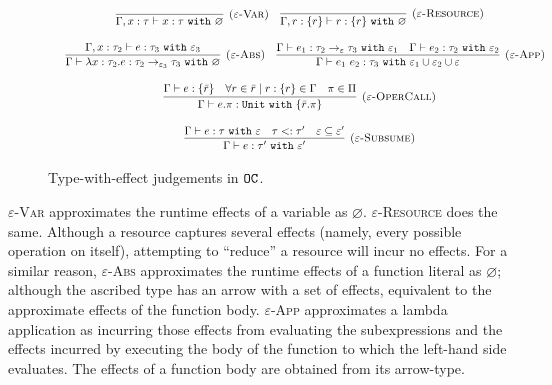 \begin{figure}[h]

\noindent
{}

\[
\begin{array}{c}

\infer[\textsc{($\varepsilon$-Var)}]
	{ \Gamma, x:\tau \vdash x: \tau~\kw{with} \varnothing }
	{}
	
	~~~
	
\infer[\textsc{($\varepsilon$-Resource)}]
 	{ \Gamma, r: \{ r \} \vdash r : \{ r \}~\kw{with} \varnothing }
 	{} \\[3ex]
 	
 	~~~
	\infer[\textsc{($\varepsilon$-Abs)}]
	{ \Gamma \vdash \lambda x:\tau_2 . e : \tau_2 \rightarrow_{\varepsilon_3} \tau_3~\kw{with} \varnothing }
	{ \Gamma, x: \tau_2 \vdash e: \tau_3~\kw{with} \varepsilon_3 }
	
	~~~
	
\infer[\textsc{($\varepsilon$-App)}]
	{ \Gamma \vdash e_1~e_2 : \tau_3~\kw{with} \varepsilon_1 \cup \varepsilon_2 \cup \varepsilon  }
	{ \Gamma \vdash e_1: \tau_2 \rightarrow_{\varepsilon} \tau_3~\kw{with} \varepsilon_1 & \Gamma \vdash e_2: \tau_2~\kw{with} \varepsilon_2 } \\[3ex]
	
\infer[\textsc{($\varepsilon$-OperCall)}]
	{ \Gamma \vdash e.\pi: \kw{Unit} \kw{with} \{ \bar r.\pi \} }
	{ \Gamma \vdash e: \{ \bar r \} & \forall r \in \bar r \mid r: \{ r \} \in \Gamma & \pi \in \Pi } \\[3ex]

\infer[\textsc{($\varepsilon$-Subsume)}]
	{ \Gamma \vdash e: \tau' ~\kw{with} \varepsilon'}
	{ \Gamma \vdash e: \tau ~\kw{with} \varepsilon & \tau <: \tau' & \varepsilon \subseteq \varepsilon'}
\end{array}
\]


\vspace{-7pt}
\caption{Type-with-effect judgements in $\mathtt{OC}$.}
\label{fig:opercalc_static_rules}
\end{figure}

\textsc{$\varepsilon$-Var} approximates the runtime effects of a variable as $\varnothing$. \textsc{$\varepsilon$-Resource} does the same. Although a resource captures several effects (namely, every possible operation on itself), attempting to ``reduce'' a resource will incur no effects. For a similar reason, \textsc{$\varepsilon$-Abs} approximates the runtime effects of a function literal as $\varnothing$; although the ascribed type has an arrow with a set of effects, equivalent to the approximate effects of the function body. \textsc{$\varepsilon$-App} approximates a lambda application as incurring those effects from evaluating the subexpressions and the effects incurred by executing the body of the function to which the left-hand side evaluates. The effects of a function body are obtained from its arrow-type.

